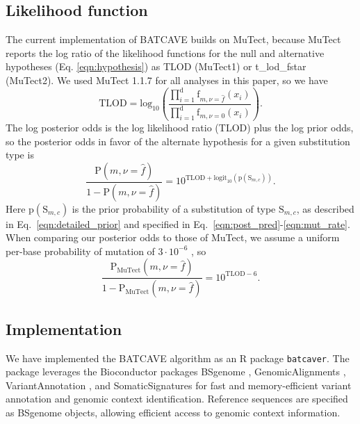\documentclass[a4,center,fleqn]{NAR}
\newcommand{\batcave}{BATCAVE\xspace}
\begin{document}

\subsection{Likelihood function}
The current implementation of \batcave builds on MuTect, because MuTect reports the log ratio of the likelihood functions for the null and alternative hypotheses (Eq. \ref{eqn:hypothesis}) as \textrm{TLOD} (MuTect1) or \textrm{t\_lod\_fstar} (MuTect2).
We used MuTect 1.1.7 for all analyses in this paper, so we have
\begin{equation}
  \label{eqn:tlod}
    \mathrm{TLOD} = \mathrm{log}_{10}\left(\frac{\prod_{i=1}^{\mathrm{d}} \textrm{f}_{m,\nu = \hat{f}}(x_i)}{\prod_{i=1}^{\mathrm{d}} \textrm{f}_{m,\nu = 0}(x_i)}\right).
\end{equation}
The log posterior odds is the log likelihood ratio (\textrm{TLOD}) plus the log prior odds, so the posterior odds in favor of the alternate hypothesis for a given substitution type is
\begin{equation}
  \label{eqn:computed_posterior}
  \frac{\mathrm{P}(m,\nu = \hat{f})}{1 - \mathrm{P}(m,\nu = \hat{f})} = 10^{\mathrm{TLOD} + \mathrm{logit}_{10}(\mathrm{p}(\mathrm{S}_{m,c}))}.
\end{equation}
Here $\mathrm{p}(\mathrm{S}_{m,c})$ is the prior probability of a substitution of type $\mathrm{S}_{m,c}$, as described in Eq.~\ref{eqn:detailed_prior} and specified in Eq.~\ref{eqn:post_pred}-\ref{eqn:mut_rate}.
When comparing our posterior odds to those of MuTect, we assume a uniform per-base probability of mutation of $3\cdot10^{-6}$ \cite{Cibulskis2013}, so
\begin{equation}  \label{eqn:mutect_posterior}
  \frac{\mathrm{P}_\mathrm{MuTect}(m,\nu = \hat{f})}{1 - \mathrm{P}_\mathrm{MuTect}(m,\nu = \hat{f})} = 10^{\mathrm{TLOD} - 6}.
\end{equation}

\subsection{Implementation}
We have implemented the \batcave algorithm as an R package \texttt{batcaver}.
The package leverages the Bioconductor packages \textrm{BSgenome} \cite{Pages2019}, \textrm{GenomicAlignments} \cite{Lawrence2013}, \textrm{VariantAnnotation} \cite{Obenchain2014}, and \textrm{SomaticSignatures} \cite{Gehring2015} for fast and memory-efficient variant annotation and genomic context identification.
Reference sequences are specified as BSgenome objects, allowing efficient access to genomic context information.
\end{document}
